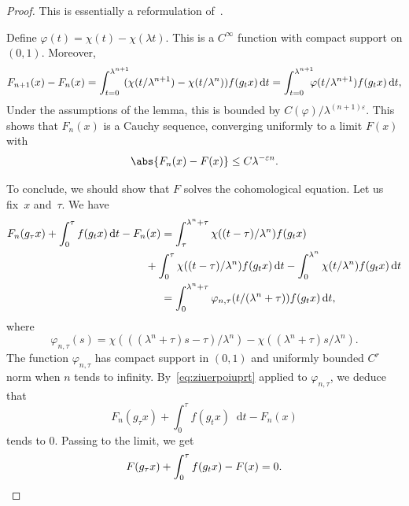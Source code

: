 \documentclass[JEP,XML,SOM,Unicode]{cedram}
\newcommand{\dd}{\mathop{}\!\mathrm{d}}
\let\epsilon\varepsilon
\let\phi\varphi
\theoremstyle{definition}
\numberwithin{equation}{section}
\begin{document}
\begin{proof}
This is essentially a reformulation of~\cite[Lem.\,1.4\,\&\,Lem.\,3.1]{giulietti_liverani}.

Define $\phi(t) = \chi(t)-\chi(\lambda t)$. This is a $C^\infty$ function
with compact support on $(0,1)$. Moreover,
\begin{equation*}
F_{n+1}(x) - F_n(x) = \int_{t=0}^{\lambda^{n+1}}\hspace*{-2mm} (\chi(t/\lambda^{n+1}) - \chi(t/\lambda^n)) f(g_t x) \dd t
= \int_{t=0}^{\lambda^{n+1}}\hspace*{-2mm} \phi(t/\lambda^{n+1}) f(g_t x) \dd t,
\end{equation*}
Under the assumptions of the lemma, this is bounded by
$C(\phi)/\lambda^{(n+1)\epsilon}$. This shows that $F_n(x)$ is a Cauchy
sequence, converging uniformly to a limit $F(x)$ with
\[
\abs{F_n(x)-F(x)} \leq
C \lambda^{-\epsilon n}.
\]

To conclude, we should show that $F$ solves the cohomological equation. Let
us fix~$x$ and~$\tau$. We have
\begin{align*}
F_n(g_\tau x) + \int_{0}^\tau f(g_t x) \dd t - F_n(x)&= \int_{\tau}^{\lambda^n + \tau} \chi((t-\tau)/\lambda^n) f(g_t x)\\
&\hspace*{-5mm}+ \int_{0}^\tau \chi((t-\tau)/\lambda^n) f(g_t x) \dd t
- \int_0^{\lambda^n} \chi(t/\lambda^n) f(g_t x) \dd t
\\
& = \int_0^{\lambda^n + \tau} \phi_{n,\tau}(t/(\lambda^n + \tau)) f(g_t x) \dd t,
\end{align*}
where
\begin{equation*}
\phi_{n,\tau}(s) = \chi( ((\lambda^n+\tau) s - \tau)/\lambda^n) - \chi( (\lambda^n+\tau)s/\lambda^n).
\end{equation*}
The function $\phi_{n,\tau}$ has compact support in $(0,1)$ and uniformly
bounded $C^r$ norm when $n$ tends to infinity. By~\eqref{eq:ziuerpoiuprt}
applied to $\phi_{n,\tau}$, we deduce that
\[
F_n(g_\tau x) + \int_{0}^\tau
f(g_t x) \dd t - F_n(x)
\]
tends to $0$. Passing to the limit, we get
\[
F(g_\tau
x) + \int_0^\tau f(g_t x) - F(x) = 0.\qedhere
\]
\end{proof}
\end{document}
